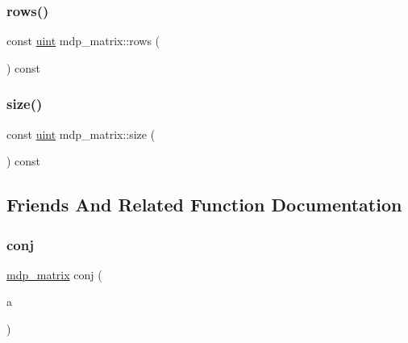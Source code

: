 \mbox{\label{classmdp__matrix_a1bdb30897895b498949c39255ff14c28}} 
\subsubsection{\texorpdfstring{rows()}{rows()}}
{\footnotesize\ttfamily const \hyperlink{mdp__global__vars_8h_a91ad9478d81a7aaf2593e8d9c3d06a14}{uint} mdp\+\_\+matrix\+::rows (\begin{DoxyParamCaption}{ }\end{DoxyParamCaption}) const\hspace{0.3cm}{\ttfamily [inline]}}

\mbox{\label{classmdp__matrix_afa317ffe0112321496fac79cc81d0d07}} 
\subsubsection{\texorpdfstring{size()}{size()}}
{\footnotesize\ttfamily const \hyperlink{mdp__global__vars_8h_a91ad9478d81a7aaf2593e8d9c3d06a14}{uint} mdp\+\_\+matrix\+::size (\begin{DoxyParamCaption}{ }\end{DoxyParamCaption}) const\hspace{0.3cm}{\ttfamily [inline]}}



\subsection{Friends And Related Function Documentation}
\mbox{\label{classmdp__matrix_ae0dd178eaad795af699d595ca0ef5c37}} 
\subsubsection{\texorpdfstring{conj}{conj}}
{\footnotesize\ttfamily \hyperlink{classmdp__matrix}{mdp\+\_\+matrix} conj (\begin{DoxyParamCaption}\item[{const \hyperlink{classmdp__matrix}{mdp\+\_\+matrix} \&}]{a }\end{DoxyParamCaption})\hspace{0.3cm}{\ttfamily [friend]}}

